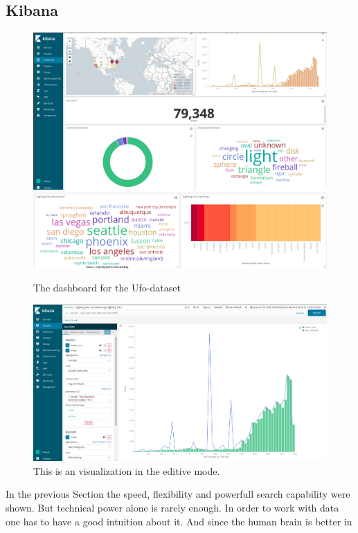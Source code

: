 \documentclass[bibliography=totoc]{article}
\begin{document}
\subsection{Kibana}
\begin{figure}
   \includegraphics[height=0.5\textwidth]{dashboard1.png} 
   \includegraphics[height=0.242\textwidth]{dashboard2.png} 
   \caption{\label{ufo_dashboard}The dashboard for the Ufo-dataset}
\end{figure}
\begin{figure}
   \includegraphics[height=0.5\textwidth]{kibana_script.png} 
   \caption{\label{json_script}This is an visualization in the editive mode.}
\end{figure}
In the previous Section the speed, flexibility and powerfull search capability
were shown. But technical power alone is rarely enough. In order to work with data 
one has to have a good intuition about it. And since the human brain is better in 
\end{document}
